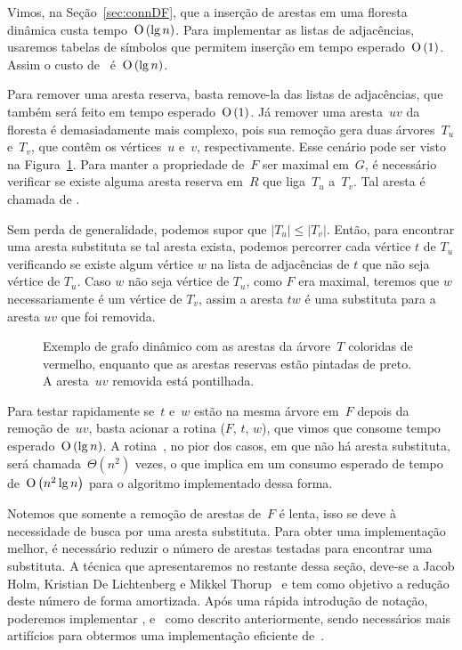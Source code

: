  Vimos, na Seção~\ref{sec:connDF}, que a inserção de arestas em uma floresta dinâmica custa tempo~$\text{O}\left(\lg n\right)$. Para implementar as listas de adjacências, usaremos tabelas de símbolos que permitem inserção em tempo esperado~$\text{O}\left(1\right)$. Assim o custo de~\dymGraphAddEdge{} é~$\text{O}\left(\lg n\right)$.

Para remover uma aresta reserva, basta remove-la das listas de adjacências, que também será feito em tempo esperado~$\text{O}\left(1\right)$. Já remover uma aresta~$uv$ da floresta é demasiadamente mais complexo, pois sua remoção gera duas árvores~$T_u$ e~$T_v$, que contêm os vértices~$u$ e~$v$, respectivamente. Esse cenário pode ser visto na Figura~\ref{fig:DG-exemploTu-Tv}. Para manter a propriedade de~$F$ ser maximal em~$G$, é necessário verificar se existe alguma aresta reserva em~$R$ que liga~$T_u$ a~$T_v$. Tal aresta é chamada de .

Sem perda de generalidade, podemos supor que $|T_u|\leqslant |T_v|$. Então, para encontrar uma aresta substituta se tal aresta exista, podemos percorrer cada vértice $t$ de $T_u$ verificando se existe algum vértice $w$ na lista de adjacências de $t$ que não seja vértice de $T_u$. Caso $w$ não seja vértice de $T_u$, como $F$ era maximal, teremos que $w$ necessariamente é um vértice de $T_v$, assim a aresta $tw$ é uma substituta para a aresta $uv$ que foi removida.

\begin{figure}[htb]
\centering
\caption{Exemplo de grafo dinâmico com as arestas da árvore~$T$ coloridas de vermelho, enquanto que as arestas reservas estão pintadas de preto. A aresta~$uv$ removida está pontilhada.}
\label{fig:DG-exemploTu-Tv}
\end{figure}

Para testar rapidamente se~$t$ e~$w$ estão na mesma árvore em~$F$ depois da remoção de~$uv$, basta acionar a rotina \dymForestQuery($F$, $t$, $w$), que vimos que consome tempo esperado~$\text{O}\left(\lg n\right)$. A rotina~\dymForestQuery{}, no pior dos casos, em que não há aresta substituta, será chamada~$\Theta(n^2)$ vezes, o que implica em um consumo esperado de tempo de~$\text{O}\left(n^2\lg n\right)$ para o algoritmo implementado dessa forma.

Notemos que somente a remoção de arestas de~$F$ é lenta, isso se deve à necessidade de busca por uma aresta substituta. Para obter uma implementação melhor, é necessário reduzir o número de arestas testadas para encontrar uma substituta. A técnica que apresentaremos no restante dessa seção, deve-se a Jacob Holm, Kristian De Lichtenberg e Mikkel Thorup~\cite{poly_log} e tem como objetivo a redução deste número de forma amortizada. Após uma rápida introdução de notação, poderemos implementar \dymGraphCreate{}, \dymGraphAddEdge{} e~\dymGraphQuery{} como descrito anteriormente, sendo necessários mais artifícios para obtermos uma implementação eficiente de~\dymGraphDelEdge{}.



